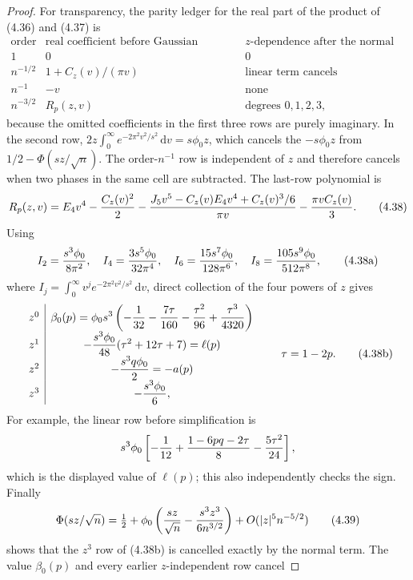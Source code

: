 \documentclass[11pt,a4paper]{article}
\numberwithin{equation}{section}
\theoremstyle{definition}
\theoremstyle{remark}
\newcommand{\dd}{\,\mathrm d}
\begin{document}
\begin{proof}
For transparency, the parity ledger for the real part of the product of
(4.36) and (4.37) is
\[
\begin{array}{c|c|c}
\text{order}&\text{real coefficient before Gaussian integration}
   &\text{$z$-dependence after the normal term}\\ \hline
1&0&0\\
n^{-1/2}&1+C_z(v)/(\pi v)&\text{linear term cancels}\\
n^{-1}&-v&\text{none}\\
n^{-3/2}&R_p(z,v)&\text{degrees }0,1,2,3,
\end{array}                                                   \tag{4.37b}
\]
because the omitted coefficients in the first three rows are purely
imaginary.  In the second row,
$2z\int_0^\infty e^{-2\pi^2v^2/s^2}\dd v=s\phi_0z$, which cancels the
$-s\phi_0z$ from $1/2-\Phi(sz/\sqrt n)$.  The order-$n^{-1}$ row is
independent of $z$ and therefore cancels when two phases in the same cell
are subtracted.  The last-row polynomial is
\[
 R_p(z,v)=E_4v^4-{C_z(v)^2\over2}
 -{J_5v^5-C_z(v)E_4v^4+C_z(v)^3/6\over\pi v}
 -{\pi vC_z(v)\over3}.                                \tag{4.38}
\]
Using
\[
 I_2={s^3\phi_0\over8\pi^2},\quad
 I_4={3s^5\phi_0\over32\pi^4},\quad
 I_6={15s^7\phi_0\over128\pi^6},\quad
 I_8={105s^9\phi_0\over512\pi^8},                    \tag{4.38a}
\]
where $I_j=\int_0^\infty v^je^{-2\pi^2v^2/s^2}\dd v$, direct collection
of the four powers of $z$ gives
\[
\begin{array}{c|c}
z^0&\displaystyle
 \beta_0(p)=\phi_0s^3\left(-{1\over32}-{7\tau\over160}
                  -{\tau^2\over96}+{\tau^3\over4320}\right)\\[1mm]
z^1&\displaystyle
 -{s^3\phi_0\over48}(\tau^2+12\tau+7)=\ell(p)\\[1mm]
z^2&\displaystyle-{s^3q\phi_0\over2}=-a(p)\\[1mm]
z^3&\displaystyle-{s^3\phi_0\over6},
\end{array}\qquad \tau=1-2p.                           \tag{4.38b}
\]
For example, the linear row before simplification is
\[
 s^3\phi_0\left[-{1\over12}+{1-6pq-2\tau\over8}
                         -{5\tau^2\over24}\right],
\]
which is the displayed value of $\ell(p)$; this also independently checks
the sign.  Finally
\[
 \Phi(sz/\sqrt n)=\tfrac12+\phi_0
 \left({sz\over\sqrt n}-{s^3z^3\over6n^{3/2}}\right)
 +O(|z|^5n^{-5/2})                                    \tag{4.39}
\]
shows that the $z^3$ row of (4.38b) is cancelled exactly by the normal
term.  The value $\beta_0(p)$ and every earlier $z$-independent row cancel

\end{proof}
\end{document}
